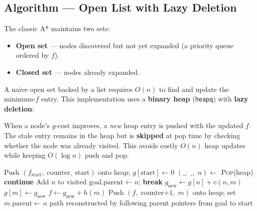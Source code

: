 \documentclass[12pt,a4paper]{article}
\begin{document}
\subsection{Algorithm --- Open List with Lazy Deletion}

The classic A* maintains two sets:
\begin{itemize}
  \item \textbf{Open set} --- nodes discovered but not yet expanded (a priority queue ordered by $f$).
  \item \textbf{Closed set} --- nodes already expanded.
\end{itemize}

A naive open set backed by a list requires $O(n)$ to find and update the
minimum-$f$ entry. This implementation uses a \textbf{binary heap}
(\texttt{heapq}) with \textbf{lazy deletion}:

\begin{tcolorbox}[definitionbox, title={Lazy Deletion}]
  When a node's $g$-cost improves, a \emph{new} heap entry is pushed
  with the updated $f$. The stale entry remains in the heap but is
  \textbf{skipped} at pop time by checking whether the node was already
  visited. This avoids costly $O(n)$ heap updates while keeping
  $O(\log n)$ push and pop.
\end{tcolorbox}

\begin{algorithm}[H]
\caption{A* with Heapq and Lazy Deletion}
\begin{algorithmic}[1]
\State Push $(f_{\text{start}},\; \text{counter},\; \text{start})$ onto heap; $g[\text{start}] \gets 0$
  \State $(\_,\; \_,\; n) \gets$ \textsc{Pop}(heap)
   \textbf{continue} 
  \EndIf
  \State Add $n$ to visited
    \State $\text{goal.parent} \gets n$; \textbf{break}
  \EndIf
    \State $g_{\text{new}} \gets g[n] + c(n, m)$
      \State $g[m] \gets g_{\text{new}}$
      \State $f \gets g_{\text{new}} + h(m)$
      \State Push $(f,\; \text{counter}{+1},\; m)$ onto heap; set $m.\text{parent} \gets n$
    \EndIf
  \EndFor
\EndWhile
\State \Return path reconstructed by following parent pointers from goal to start
\end{algorithmic}
\end{algorithm}
\end{document}
